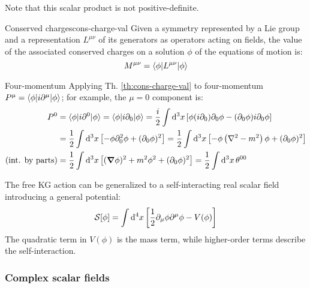 Note that this scalar product is not positive-definite.

\begin{theorem}{Conserved charges}{cons-charge-val}
  Given a symmetry represented by a Lie group and a representation $ L^{\mu \nu} $ of its generators as operators acting on fields, the value of the associated conserved charges on a solution $ \phi $ of the equations of motion is:
  \begin{equation}
    M^{\mu \nu} = \braket{\phi | L^{\mu \nu} | \phi}
    \label{eq:1.79}
  \end{equation}
\end{theorem}

\begin{example}{Four-momentum}{}
  Applying Th. \ref{th:cons-charge-val} to four-momentum $ P^\mu = \braket{\phi | i \partial^\mu | \phi} $; for example, the $ \mu = 0 $ component is:
  \begin{equation*}
    \begin{split}
      P^0 &= \braket{\phi | i \partial^0 | \phi} = \braket{\phi | i \partial_0 | \phi} = \frac{i}{2} \int \mathrm{d}^3 x \left[ \phi (i \partial_0) \partial_0 \phi - (\partial_0 \phi) i \partial_0 \phi \right] \\
          &= \frac{1}{2} \int \mathrm{d}^3 x \left[ - \phi \partial_0^2 \phi + (\partial_0 \phi)^2 \right] = \frac{1}{2} \int \mathrm{d}^3 x \left[ - \phi \left( \nabla^2 - m^2 \right) \phi + (\partial_0 \phi)^2 \right] \\
      (\text{int. by parts}) &= \frac{1}{2} \int \mathrm{d}^3 x \left[ (\boldsymbol{\nabla} \phi)^2 + m^2 \phi^2 + (\partial_0 \phi)^2 \right] = \frac{1}{2} \int \mathrm{d}^3 x\, \theta^{00}
    \end{split}
  \end{equation*}
\end{example}

The free KG action can be generalized to a self-interacting real scalar field introducing a general potential:
\begin{equation}
  \mathcal{S}[\phi] = \int \mathrm{d}^4 x \left[ \frac{1}{2} \partial_\mu \phi \partial^\mu \phi - V(\phi) \right]
  \label{eq:1.80}
\end{equation}
The quadratic term in $ V(\phi) $ is the mass term, while higher-order terms describe the self-interaction.

\subsubsection{Complex scalar fields}

